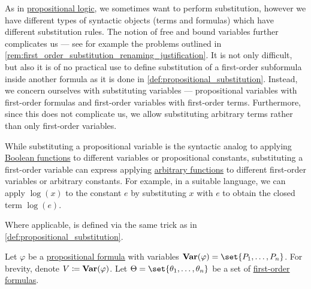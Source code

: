 \begin{definition}\label{def:first_order_substitution}
  As in \hyperref[sec:propositional_logic]{propositional logic}, we sometimes want to perform substitution, however we have different types of syntactic objects (terms and formulas) which have different substitution rules. The notion of free and bound variables further complicates us --- see for example the problems outlined in \cref{rem:first_order_substitution_renaming_justification}. It is not only difficult, but also it is of no practical use to define substitution of a first-order subformula inside another formula as it is done in \cref{def:propositional_substitution}. Instead, we concern ourselves with substituting variables --- propositional variables with first-order formulas and first-order variables with first-order terms. Furthermore, since this does not complicate us, we allow substituting arbitrary terms rather than only first-order variables.

  While substituting a propositional variable is the syntactic analog to applying \hyperref[def:boolean_function]{Boolean functions} to different variables or propositional constants, substituting a first-order variable can express applying \hyperref[def:function]{arbitrary functions} to different first-order variables or arbitrary constants. For example, in a suitable language, we can apply \( \log(x) \) to the constant \( e \) by substituting \( x \) with \( e \) to obtain the closed term \( \log(e) \).

  Where applicable,  is defined via the same trick as in \cref{def:propositional_substitution}.

  \begin{thmenum}
     Let \( \varphi \) be a \hyperref[def:propositional_syntax/formula]{propositional formula} with variables \( \op*{Var}(\varphi) = \set{ P_1, \ldots, P_n } \). For brevity, denote \( V \coloneqq \op*{Var}(\varphi) \). Let \( \Theta = \set{ \theta_1, \ldots, \theta_n } \) be a set of \hyperref[def:first_order_syntax/formula]{first-order formulas}.


\end{thmenum}
\end{definition}
